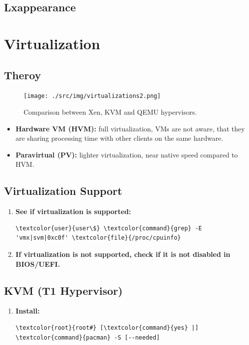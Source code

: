 \documentclass[10pt, a4paper, onecolumn, oneside, titlepage, openany]{book}
\begin{document}
\section{Lxappearance}



\chapter{Virtualization}
\section{Theroy}
\begin{figure}[ht]
    \begin{center}
        \texttt{[image: ./src/img/virtualizations2.png]}
        \caption{Comparison between Xen, KVM and QEMU hypervisors.}
        \label{fig:3}
    \end{center}
\end{figure}
\begin{itemize}
    \item \textbf{Hardware VM (HVM):} full virtualization, VMs are not aware, that they are sharing processing time with other clients on the same hardware.
    \item \textbf{Paravirtual (PV):} lighter virtualization, near native speed compared to HVM.
\end{itemize}

\section{Virtualization Support}
\begin{enumerate}
    \item \textbf{See if virtualization is supported:}
\begin{Verbatim}[commandchars=\\\{\}]
\textcolor{user}{user\$} \textcolor{command}{grep} -E 'vmx|svm|0xc0f' \textcolor{file}{/proc/cpuinfo}
\end{Verbatim}
    \item \textbf{If virtualization is not supported, check if it is not disabled in BIOS/UEFI.}
\end{enumerate}

\section{KVM (T1 Hypervisor)}
\begin{enumerate}
    \item \textbf{Install:}
\begin{Verbatim}[commandchars=\\\{\}]
\textcolor{root}{root#} [\textcolor{command}{yes} |] \textcolor{command}{pacman} -S [--needed] 
\end{Verbatim}
\end{enumerate}
\end{document}
